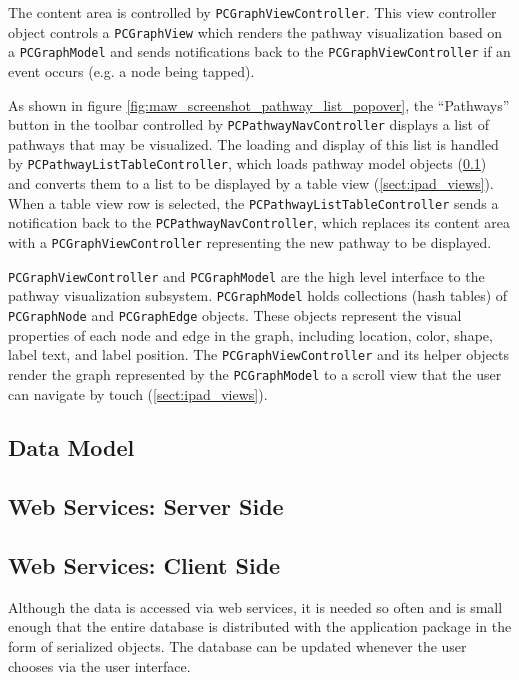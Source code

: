The content area is controlled by \texttt{PCGraphViewController}. This view
controller object controls a \texttt{PCGraphView} which renders the pathway
visualization based on a \texttt{PCGraphModel} and sends notifications back to
the \texttt{PCGraphViewController} if an event occurs (e.g. a node being tapped).

As shown in figure \ref{fig:maw_screenshot_pathway_list_popover}, the
``Pathways'' button in the toolbar controlled by \texttt{PCPathwayNavController}
displays a list of pathways that may be visualized. The loading and display of
this list is handled by \texttt{PCPathwayListTableController}, which loads
pathway model objects (\ref{sect:smda_data_model}) and converts them
to a list to be displayed by a table view (\ref{sect:ipad_views}). When a table
view row is selected, the \texttt{PCPathwayListTableController} sends a
notification back to the \texttt{PCPathwayNavController}, which replaces its
content area with a \texttt{PCGraphViewController} representing the new pathway
to be displayed.

\texttt{PCGraphViewController} and \texttt{PCGraphModel} are the high level
interface to the pathway visualization subsystem. \texttt{PCGraphModel} holds
collections (hash tables) of \texttt{PCGraphNode} and \texttt{PCGraphEdge}
objects. These objects represent the visual properties of each node and edge in
the graph, including location, color, shape, label text, and label position. The
\texttt{PCGraphViewController} and its helper objects render the graph
represented by the \texttt{PCGraphModel} to a scroll view
that the user can navigate by touch (\ref{sect:ipad_views}). 

\subsection{Data Model}
\label{sect:smda_data_model}



\subsection{Web Services: Server Side}
\label{sect:smda_web_services_server}

\subsection{Web Services: Client Side}
\label{sect:smda_web_services_client}

Although the data is accessed via web services, it is needed so often and is
small enough that the entire database is distributed with the application
package in the form of serialized objects. The database can be updated whenever
the user chooses via the user interface.

